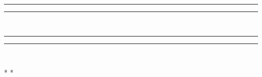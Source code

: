 \newpage

\centering %
\vspace*{\baselineskip} %

\rule{\textwidth}{1.6pt}\vspace*{-\baselineskip}\vspace*{2pt} %
\rule{\textwidth}{0.4pt}\\[\baselineskip] %


\rule{\textwidth}{0.4pt}\vspace*{-\baselineskip}\vspace{3.2pt} %
\rule{\textwidth}{1.6pt}\\[\baselineskip] %


\vspace*{25\baselineskip} %


\vfill %

{\scshape * * *}\par %
\newpage
